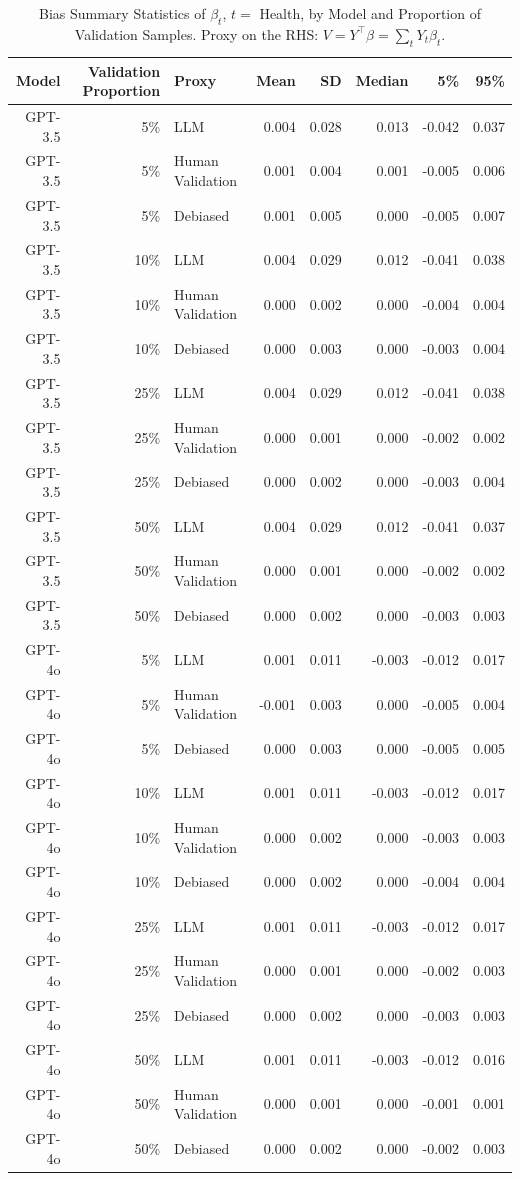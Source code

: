 \begin{table}

\caption{Bias Summary Statistics of $\beta_{t}$, $t=$ Health, by Model and Proportion of Validation Samples.
      Proxy on the RHS: $V = Y^\top \beta = \sum_{t} Y_t \beta_t$.}
\centering
\begin{tabular}[t]{rrlrrrrr}
\toprule
Model & Validation Proportion & Proxy & Mean & SD & Median & 5\% & 95\%\\
\midrule
GPT-3.5 & 5\% & LLM & 0.004 & 0.028 & 0.013 & -0.042 & 0.037\\
GPT-3.5 & 5\% & Human Validation & 0.001 & 0.004 & 0.001 & -0.005 & 0.006\\
GPT-3.5 & 5\% & Debiased & 0.001 & 0.005 & 0.000 & -0.005 & 0.007\\
GPT-3.5 & 10\% & LLM & 0.004 & 0.029 & 0.012 & -0.041 & 0.038\\
GPT-3.5 & 10\% & Human Validation & 0.000 & 0.002 & 0.000 & -0.004 & 0.004\\
GPT-3.5 & 10\% & Debiased & 0.000 & 0.003 & 0.000 & -0.003 & 0.004\\
GPT-3.5 & 25\% & LLM & 0.004 & 0.029 & 0.012 & -0.041 & 0.038\\
GPT-3.5 & 25\% & Human Validation & 0.000 & 0.001 & 0.000 & -0.002 & 0.002\\
GPT-3.5 & 25\% & Debiased & 0.000 & 0.002 & 0.000 & -0.003 & 0.004\\
GPT-3.5 & 50\% & LLM & 0.004 & 0.029 & 0.012 & -0.041 & 0.037\\
GPT-3.5 & 50\% & Human Validation & 0.000 & 0.001 & 0.000 & -0.002 & 0.002\\
GPT-3.5 & 50\% & Debiased & 0.000 & 0.002 & 0.000 & -0.003 & 0.003\\
GPT-4o & 5\% & LLM & 0.001 & 0.011 & -0.003 & -0.012 & 0.017\\
GPT-4o & 5\% & Human Validation & -0.001 & 0.003 & 0.000 & -0.005 & 0.004\\
GPT-4o & 5\% & Debiased & 0.000 & 0.003 & 0.000 & -0.005 & 0.005\\
GPT-4o & 10\% & LLM & 0.001 & 0.011 & -0.003 & -0.012 & 0.017\\
GPT-4o & 10\% & Human Validation & 0.000 & 0.002 & 0.000 & -0.003 & 0.003\\
GPT-4o & 10\% & Debiased & 0.000 & 0.002 & 0.000 & -0.004 & 0.004\\
GPT-4o & 25\% & LLM & 0.001 & 0.011 & -0.003 & -0.012 & 0.017\\
GPT-4o & 25\% & Human Validation & 0.000 & 0.001 & 0.000 & -0.002 & 0.003\\
GPT-4o & 25\% & Debiased & 0.000 & 0.002 & 0.000 & -0.003 & 0.003\\
GPT-4o & 50\% & LLM & 0.001 & 0.011 & -0.003 & -0.012 & 0.016\\
GPT-4o & 50\% & Human Validation & 0.000 & 0.001 & 0.000 & -0.001 & 0.001\\
GPT-4o & 50\% & Debiased & 0.000 & 0.002 & 0.000 & -0.002 & 0.003\\
\bottomrule
\end{tabular}
\end{table}

